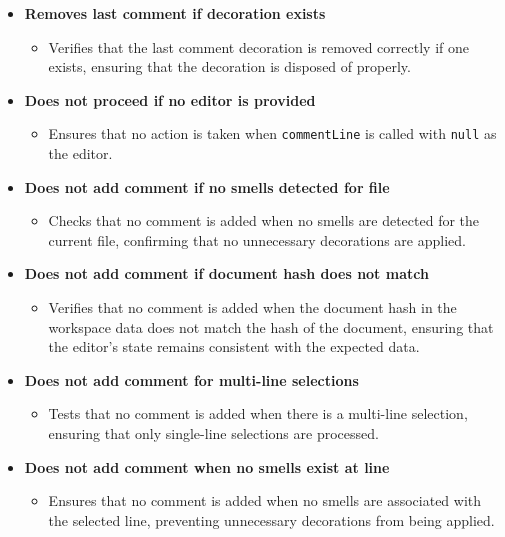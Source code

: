 \documentclass[12pt, titlepage]{article}
\begin{document}
\begin{itemize}
    \item \textbf{Removes last comment if decoration exists}
    \begin{itemize}
        \item Verifies that the last comment decoration is removed correctly if one exists, ensuring that the decoration is disposed of properly.
    \end{itemize}

    \item \textbf{Does not proceed if no editor is provided}
    \begin{itemize}
        \item Ensures that no action is taken when \texttt{commentLine} is called with \texttt{null} as the editor.
    \end{itemize}

    \item \textbf{Does not add comment if no smells detected for file}
    \begin{itemize}
        \item Checks that no comment is added when no smells are detected for the current file, confirming that no unnecessary decorations are applied.
    \end{itemize}

    \item \textbf{Does not add comment if document hash does not match}
    \begin{itemize}
        \item Verifies that no comment is added when the document hash in the workspace data does not match the hash of the document, ensuring that the editor's state remains consistent with the expected data.
    \end{itemize}

    \item \textbf{Does not add comment for multi-line selections}
    \begin{itemize}
        \item Tests that no comment is added when there is a multi-line selection, ensuring that only single-line selections are processed.
    \end{itemize}

    \item \textbf{Does not add comment when no smells exist at line}
    \begin{itemize}
        \item Ensures that no comment is added when no smells are associated with the selected line, preventing unnecessary decorations from being applied.
    \end{itemize}


\end{itemize}
\end{document}
